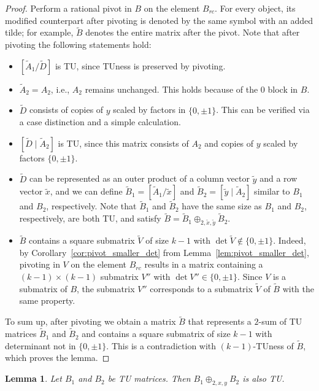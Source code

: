 \documentclass{article}
\newtheorem{lemma}{Lemma}
\theoremstyle{definition}
\begin{document}
\begin{proof}
    Perform a rational pivot in $B$ on the element $B_{rc}$. For every object, its modified counterpart after pivoting is denoted by the same symbol with an added tilde; for example, $\tilde{B}$ denotes the entire matrix after the pivot. Note that after pivoting the following statements hold:
    \begin{itemize}
        \item $\left[\tilde{A}_{1} / \tilde{D}\right]$ is TU, since TUness is preserved by pivoting.
        \item $\tilde{A}_{2} = A_{2}$, i.e., $A_{2}$ remains unchanged. This holds because of the $0$ block in $B$.
        \item $\tilde{D}$ consists of copies of $y$ scaled by factors in $\{0, \pm 1\}$. This can be verified via a case distinction and a simple calculation.
        \item $\left[\tilde{D} \mid \tilde{A}_{2}\right]$ is TU, since this matrix consists of $A_{2}$ and copies of $y$ scaled by factors $\{0, \pm 1\}$.
        \item $\tilde{D}$ can be represented as an outer product of a column vector $\tilde{y}$ and a row vector $\tilde{x}$, and we can define $\tilde{B}_{1} = \left[\tilde{A}_{1} / \tilde{x}\right]$ and $\tilde{B}_{2} = \left[\tilde{y} \mid \tilde{A}_{2}\right]$ similar to $B_{1}$ and $B_{2}$, respectively. Note that $\tilde{B}_{1}$ and $\tilde{B}_{2}$ have the same size as $B_{1}$ and $B_{2}$, respectively, are both TU, and satisfy $\tilde{B} = \tilde{B}_{1} \oplus_{2, \tilde{x}, \tilde{y}} \tilde{B}_{2}$.
        \item $\tilde{B}$ contains a square submatrix $\tilde{V}$ of size $k - 1$ with $\det \tilde{V} \notin \{0, \pm 1\}$. Indeed, by Corollary~\ref{cor:pivot_smaller_det} from Lemma~\ref{lem:pivot_smaller_det}, pivoting in $V$ on the element $B_{rc}$ results in a matrix containing a $(k - 1) \times (k - 1)$ submatrix $V''$ with $\det V'' \in \{0, \pm 1\}$. Since $V$ is a submatrix of $B$, the submatrix $V''$ corresponds to a submatrix $\tilde{V}$ of $\tilde{B}$ with the same property.
    \end{itemize}
    To sum up, after pivoting we obtain a matrix $\tilde{B}$ that represents a $2$-sum of TU matrices $\tilde{B}_{1}$ and $\tilde{B}_{2}$ and contains a square submatrix of size $k - 1$ with determinant not in $\{0, \pm 1\}$. This is a contradiction with $(k - 1)$-TUness of $\tilde{B}$, which proves the lemma.
\end{proof}

\begin{lemma}
    Let $B_{1}$ and $B_{2}$ be TU matrices. Then $B_{1} \oplus_{2, x, y} B_{2}$ is also TU.
\end{lemma}
\end{document}
